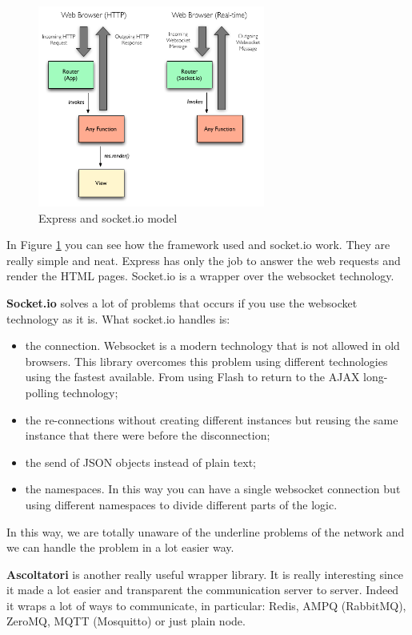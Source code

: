 \begin{figure}[H]
\centering %
\includegraphics[height=250px]{img/express.png}
\caption{Express and socket.io model}
\label{fig:expressSocketio}
\end{figure}

In Figure \ref{fig:expressSocketio} you can see how the framework used and socket.io work. They are really simple and neat. Express has only the job to answer the web requests and render the HTML pages. Socket.io is a wrapper over the websocket technology.

\textbf{Socket.io} solves a lot of problems that occurs if you use the websocket technology as it is. What socket.io handles is:
\begin{itemize}
\item the connection. Websocket is a modern technology that is not allowed in old browsers. This library overcomes this problem using different technologies using the fastest available. From using Flash to return to the AJAX long-polling technology;
\item the re-connections without creating different instances but reusing the same instance that there were before the disconnection;
\item the send of JSON objects instead of plain text;
\item the namespaces. In this way you can have a single websocket connection but using different namespaces to divide different parts of the logic.
\end{itemize}

In this way, we are totally unaware of the underline problems of the network and we can handle the problem in a lot easier way.

\textbf{Ascoltatori} is another really useful wrapper library. It is really interesting since it made a lot easier and transparent the communication server to server. Indeed it wraps a lot of ways to communicate, in particular: Redis, AMPQ (RabbitMQ), ZeroMQ, MQTT (Mosquitto) or just plain node.

